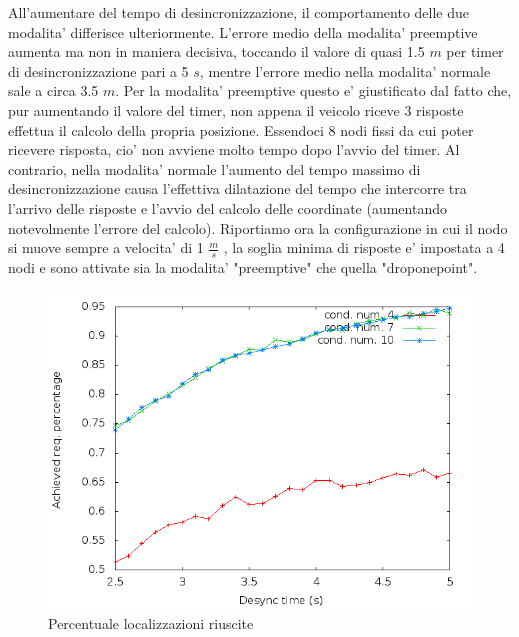 \documentclass[Lau,binding=0.6cm]{sapthesis}
\begin{document}
All'aumentare del tempo di desincronizzazione, il comportamento delle due modalita' differisce ulteriormente. L'errore medio della modalita' preemptive aumenta ma non in maniera decisiva, toccando il valore di quasi 1.5 $m$ per timer di desincronizzazione pari a 5 $s$, mentre l'errore medio nella modalita' normale sale a circa 3.5 $m$. Per la modalita' preemptive questo e' giustificato dal fatto che, pur aumentando il valore del timer, non appena il veicolo riceve 3 risposte effettua il calcolo della propria posizione. Essendoci 8 nodi fissi da cui poter ricevere risposta, cio' non avviene molto tempo dopo l'avvio del timer. Al contrario, nella modalita' normale l'aumento del tempo massimo di desincronizzazione causa l'effettiva dilatazione del tempo che intercorre tra l'arrivo delle risposte e l'avvio del calcolo delle coordinate (aumentando notevolmente l'errore del calcolo).
Riportiamo ora la configurazione in cui il nodo si muove sempre a velocita' di 1 $\frac{m}{s}$ , la soglia minima di risposte e' impostata a 4 nodi e sono attivate sia la modalita' "preemptive" che quella "droponepoint". 
\begin{figure}[H]
    \centering
    \includegraphics[scale=0.5]{octagonsimulation/achievedlocreq4preempt1drop1speed1.png}
    \caption{Percentuale localizzazioni riuscite}
    \label{fig:octagonsimulation/achievedlocreq4preempt1drop1speed1}
\end{figure}
\end{document}
